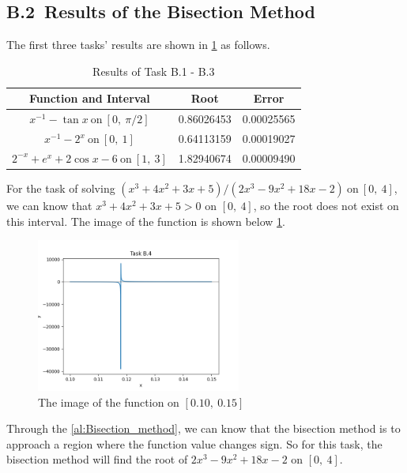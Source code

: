 \documentclass[a4paper]{article}
\begin{document}
\subsection*{B.2\ Results of the Bisection Method}

The first three tasks' results are shown in \cref{tab:B.1-B.3} as follows.

\begin{table}[htbp]
  \centering
  \begin{tabular}{|c|c|c|}
    \hline 
    \textbf{Function and Interval} & \textbf{Root} & \textbf{Error} \\
    \hline
    $x^{-1} - \tan x \ \mathrm{on} \ [0,\ \pi/2]$ & 0.86026453 & 0.00025565 \\
    \hline
    $x^{-1} - 2^x \ \mathrm{on} \ [0,\ 1]$ & 0.64113159 & 0.00019027 \\
    \hline 
    $2^{-x} + e^x + 2 \cos x - 6 \ \mathrm{on} \ [1,\ 3]$ & 1.82940674 & 0.00009490 \\
    \hline
  \end{tabular}
  \caption{Results of Task B.1 - B.3}
  \label{tab:B.1-B.3}
\end{table}

For the task of solving $(x^3 + 4x^2 + 3x + 5)/(2x^3 - 9x^2 + 18x - 2) \ \mathrm{on} \ [0,\ 4]$, 
we can know that $x^3 + 4x^2 + 3x + 5 > 0$ on $[0,\ 4]$, so the root does not exist on this interval. The image of the function is shown below \cref{fig:task_b4}.

\begin{figure}[htbp]
  \centering
  \includegraphics[width = 0.6\textwidth]{../images/task_b4.png}
  \caption{The image of the function on $[0.10,\ 0.15]$}
  \label{fig:task_b4}
\end{figure}

Through the \cref{al:Bisection_method}, we can know that the bisection method is to approach a region where the function value changes sign. 
So for this task, the bisection method will find the root of $2x^3 - 9x^2 + 18x - 2$ on $[0,\ 4]$.
\end{document}

